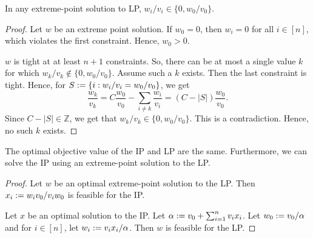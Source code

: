 \documentclass[a4paper,12pt,fleqn]{article}
\begin{document}
\begin{lemma}
In any extreme-point solution to LP, $w_i/v_i \in \{0, w_0/v_0\}$.
\end{lemma}
\begin{proof}
Let $w$ be an extreme point solution.
If $w_0 = 0$, then $w_i = 0$ for all $i \in [n]$,
which violates the first constraint. Hence, $w_0 > 0$.

$w$ is tight at at least $n+1$ constraints.
So, there can be at most a single value $k$ for which $w_k/v_k \not\in \{0, w_0/v_0\}$.
Assume such a $k$ exists. Then the last constraint is tight.
Hence, for $S := \{i: w_i/v_i = w_0/v_0\}$, we get
\[ \frac{w_k}{v_k} = C\frac{w_0}{v_0} - \sum_{i \neq k} \frac{w_i}{v_i} = (C-|S|)\frac{w_0}{v_0}. \]
Since $C - |S| \in \mathbb{Z}$, we get that $w_k/v_k \in \{0, w_0/v_0\}$.
This is a contradiction. Hence, no such $k$ exists.
\end{proof}

\begin{lemma}[LP vs IP]
The optimal objective value of the IP and LP are the same.
Furthermore, we can solve the IP using an extreme-point solution to the LP.
\end{lemma}
\begin{proof}
Let $w$ be an optimal extreme-point solution to the LP.
Then $x_i := w_iv_0/v_iw_0$ is feasible for the IP.

Let $x$ be an optimal solution to the IP.
Let $\alpha := v_0 + \sum_{i=1}^n v_ix_i$.
Let $w_0 := v_0/\alpha$ and for $i \in [n]$, let $w_i := v_ix_i/\alpha$.
Then $w$ is feasible for the LP.
\end{proof}



\end{document}
